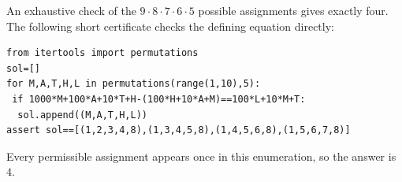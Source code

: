 An exhaustive check of the $ 9\cdot8\cdot7\cdot6\cdot5 $ possible assignments gives exactly four. The following short certificate checks the defining equation directly:
\begin{verbatim}
from itertools import permutations
sol=[]
for M,A,T,H,L in permutations(range(1,10),5):
 if 1000*M+100*A+10*T+H-(100*H+10*A+M)==100*L+10*M+T:
  sol.append((M,A,T,H,L))
assert sol==[(1,2,3,4,8),(1,3,4,5,8),(1,4,5,6,8),(1,5,6,7,8)]
\end{verbatim}
Every permissible assignment appears once in this enumeration, so the answer is $\boxed4 $.
